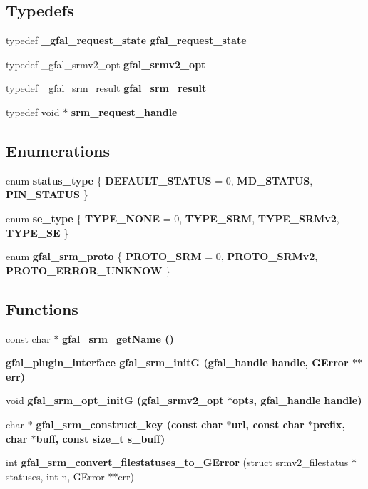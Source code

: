 \subsection*{Typedefs}
\begin{CompactItemize}
\item 
typedef \bf{\_\-gfal\_\-request\_\-state} \bf{gfal\_\-request\_\-state}
\item 
typedef \_\-gfal\_\-srmv2\_\-opt \textbf{gfal\_\-srmv2\_\-opt}\label{gfal__common__srm_8h_a3bcd91e6251d7f36da98c2145fa117b}

\item 
typedef \_\-gfal\_\-srm\_\-result \textbf{gfal\_\-srm\_\-result}\label{gfal__common__srm_8h_9098edc68db720cb1ae7849f51b5191b}

\item 
typedef void $\ast$ \textbf{srm\_\-request\_\-handle}\label{gfal__common__srm_8h_87f5a32879caba96e260c7e70c16888f}

\end{CompactItemize}
\subsection*{Enumerations}
\begin{CompactItemize}
\item 
enum \textbf{status\_\-type} \{ \textbf{DEFAULT\_\-STATUS} =  0, 
\textbf{MD\_\-STATUS}, 
\textbf{PIN\_\-STATUS}
 \}
\item 
enum \textbf{se\_\-type} \{ \textbf{TYPE\_\-NONE} =  0, 
\textbf{TYPE\_\-SRM}, 
\textbf{TYPE\_\-SRMv2}, 
\textbf{TYPE\_\-SE}
 \}
\item 
enum \textbf{gfal\_\-srm\_\-proto} \{ \textbf{PROTO\_\-SRM} = 0, 
\textbf{PROTO\_\-SRMv2}, 
\textbf{PROTO\_\-ERROR\_\-UNKNOW}
 \}
\end{CompactItemize}
\subsection*{Functions}
\begin{CompactItemize}
\item 
const char $\ast$ \bf{gfal\_\-srm\_\-get\-Name} ()
\item 
\bf{gfal\_\-plugin\_\-interface} \textbf{gfal\_\-srm\_\-init\-G} (gfal\_\-handle handle, GError $\ast$$\ast$err)\label{gfal__common__srm_8h_27d0d7b427ff691a29a73e147b195c61}

\item 
void \bf{gfal\_\-srm\_\-opt\_\-init\-G} (gfal\_\-srmv2\_\-opt $\ast$opts, gfal\_\-handle handle)
\item 
char $\ast$ \bf{gfal\_\-srm\_\-construct\_\-key} (const char $\ast$url, const char $\ast$prefix, char $\ast$buff, const size\_\-t s\_\-buff)
\item 
int \textbf{gfal\_\-srm\_\-convert\_\-filestatuses\_\-to\_\-GError} (struct srmv2\_\-filestatus $\ast$statuses, int n, GError $\ast$$\ast$err)\label{gfal__common__srm_8h_9177e8f96da30fda27c71daead3ff4e8}

\end{CompactItemize}


